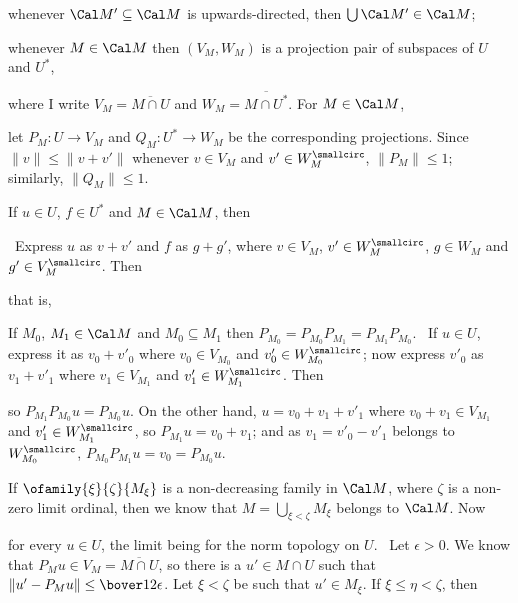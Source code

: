 {{whenever $\Cal M'\subseteq\Cal M$ is upwards-directed, then
$\bigcup\Cal M'\in\Cal M$;

whenever $M\in\Cal M$ then $(V_M,W_M)$
is a projection pair of subspaces of $U$ and $U^*$,}

\noindent where I write $V_M=\overline{M\cap U}$ and
$W_M=\overline{M\cap U^*}$.   For $M\in\Cal M$,


\noindent let $P_M:U\to V_M$ and $Q_M:U^*\to W_M$ be the corresponding
projections.   Since $\|v\|\le\|v+v'\|$ whenever $v\in V_M$ and
$v'\in W_M^{\smallcirc}$, $\|P_M\|\le 1$;  similarly, $\|Q_M\|\le 1$.

If $u\in U$, $f\in U^*$ and $M\in\Cal M$, then


\noindent\Prf\ Express $u$ as $v+v'$ and $f$ as $g+g'$, where $v\in V_M$,
$v'\in W_M^{\smallcirc}$, $g\in W_M$ and $g'\in V_M^{\smallcirc}$.   Then


\noindent that is,


\medskip

 If $M_0$, $M_1\in\Cal M$ and $M_0\subseteq M_1$ then
$P_{M_0}=P_{M_0}P_{M_1}=P_{M_1}P_{M_0}$.   \Prf\ If $u\in U$, express it as
$v_0+v'_0$ where $v_0\in V_{M_0}$ and $v'_0\in W_{M_0}^{\smallcirc}$;
now express $v'_0$ as $v_1+v'_1$ where $v_1\in V_{M_1}$ and
$v'_1\in W_{M_1}^{\smallcirc}$.   Then


\noindent so $P_{M_1}P_{M_0}u=P_{M_0}u$.   On the other hand,
$u=v_0+v_1+v'_1$ where $v_0+v_1\in V_{M_1}$ and
$v'_1\in W_{M_1}^{\smallcirc}$,  so $P_{M_1}u=v_0+v_1$;  and as
$v_1=v'_0-v'_1$ belongs to $W_{M_0}^{\smallcirc}$,
$P_{M_0}P_{M_1}u=v_0=P_{M_0}u$.\ \Qed

\medskip

 If $\ofamily{\xi}{\zeta}{M_{\xi}}$ is a non-decreasing
family in $\Cal M$,
where $\zeta$ is a non-zero limit ordinal, then we know
that $M=\bigcup_{\xi<\zeta}M_{\xi}$ belongs to $\Cal M$.   Now


\noindent for every $u\in U$, the limit being for the norm topology on $U$.
\Prf\ Let $\epsilon>0$.   We know that $P_Mu\in V_M=\overline{M\cap U}$,
so there is a $u'\in M\cap U$ such that $\|u'-P_Mu\|\le\bover12\epsilon$.
Let $\xi<\zeta$ be such that $u'\in M_{\xi}$.   If $\xi\le\eta<\zeta$, then

}
